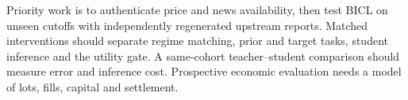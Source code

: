 Priority work is to authenticate price and news availability, then test
BICL on unseen cutoffs with independently regenerated upstream reports.
Matched interventions should separate regime matching, prior and target
tasks, student inference and the utility gate. A same-cohort
teacher--student comparison should measure error and inference cost.
Prospective economic evaluation needs a model of lots, fills, capital
and settlement.
